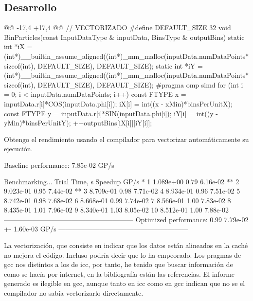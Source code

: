 \subsection{Desarrollo}
\begin{listing}[firstnumber=16]
    @@ -17,4 +17,4 @@
    // VECTORIZADO
    #define DEFAULT_SIZE 32
    void BinParticles(const InputDataType & inputData, BinsType & outputBins) {
        static int *iX = (int*)__builtin_assume_aligned((int*)_mm_malloc(inputData.numDataPoints*sizeof(int), DEFAULT_SIZE), DEFAULT_SIZE);
        static int *iY = (int*)__builtin_assume_aligned((int*)_mm_malloc(inputData.numDataPoints*sizeof(int), DEFAULT_SIZE), DEFAULT_SIZE);
    #pragma omp simd
        for (int i = 0; i < inputData.numDataPoints; i++) { 
            const FTYPE x = inputData.r[i]*COS(inputData.phi[i]); 
            iX[i] = int((x - xMin)*binsPerUnitX);
            const FTYPE y = inputData.r[i]*SIN(inputData.phi[i]); 
            iY[i] = int((y - yMin)*binsPerUnitY); 
            ++outputBins[iX[i]][iY[i]];
        } 
    }
\end{listing}
\par Obtengo el rendimiento usando el compilador para vectorizar automáticamente su ejecución.
\begin{listing}[style=consola]
    Baseline performance: 7.85e-02 GP/s 
    
    Benchmarking...
        Trial Time, s       Speedup     GP/s *
            1 1.089e+00     0.79    6.16e-02 **
            2 9.023e-01     0.95    7.44e-02 **
            3 8.709e-01     0.98    7.71e-02
            4 8.934e-01     0.96    7.51e-02
            5 8.742e-01     0.98    7.68e-02
            6 8.668e-01     0.99    7.74e-02
            7 8.566e-01     1.00    7.83e-02
            8 8.435e-01     1.01    7.96e-02
            9 8.340e-01     1.03    8.05e-02
            10 8.512e-01    1.00    7.88e-02
    ---------------------------------------------------------
    Optimized performance: 0.99 7.79e-02 +- 1.60e-03 GP/s
    ---------------------------------------------------------
\end{listing}
\par La vectorización, que consiste en indicar que los datos están alineados en la caché no mejora 
el código. Incluso podría decir que lo ha empeorado. Los pragmas de gcc nos distintos a los de icc, 
por tanto, he tenido que buscar información de como se hacía por internet, en la bibliografía están 
las referencias. El informe generado es ilegible en gcc, aunque tanto en icc como en gcc indican 
que no se el compilador no sabía vectorizarlo directamente.
